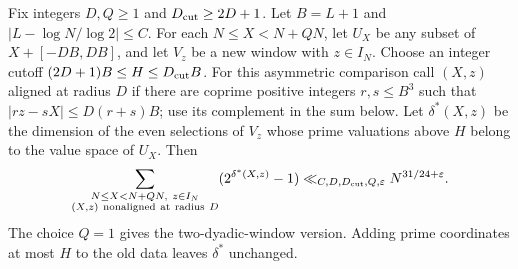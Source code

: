 \begin{lemma}\label{p1:arith:asymmetric}
Fix integers $D,Q\geq1$ and $D_{\rm cut}\geq2D+1$.
Let $B=L+1$ and $|L-\log N/\log2|\leq C$.
For each $N\leq X<N+QN$, let $U_X$ be any subset of
$X+[-DB,DB]$, and let $V_z$ be a new window with $z\in I_N$.
Choose an integer cutoff
$(2D+1)B\leq H\leq D_{\rm cut}B$.
For this asymmetric comparison call $(X,z)$ aligned at radius $D$ if
there are coprime positive integers $r,s\leq B^3$ such that
$|rz-sX|\leq D(r+s)B$; use its complement in the sum below.
Let $\delta^*(X,z)$ be the dimension of the even selections
of $V_z$ whose prime valuations above $H$ belong to the value space of
$U_X$.  Then
\[
 \sum_{\substack{N\leq X<N+QN,\ z\in I_N\\
                 (X,z)\ {\rm nonaligned\ at\ radius}\ D}}
       (2^{\delta^*(X,z)}-1)
 \ll_{C,D,D_{\rm cut},Q,\varepsilon}N^{31/24+\varepsilon}.
\]
The choice $Q=1$ gives the two-dyadic-window version.
Adding prime coordinates at most $H$ to the old data leaves
$\delta^*$ unchanged.
\end{lemma}

